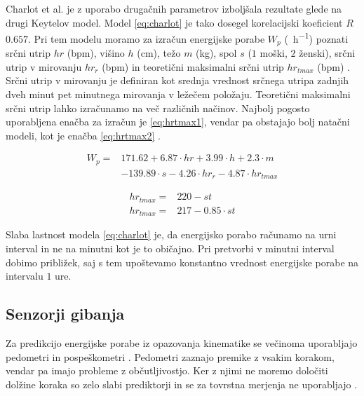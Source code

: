 Charlot et al. \cite{charlot2014improvement} je z uporabo drugačnih parametrov izboljšala rezultate glede na drugi Keytelov model. Model \eqref{eq:charlot} je tako dosegel korelacijski koeficient $R$ $0.657$. Pri tem modelu moramo za izračun energijske porabe $W_p$ (\si{\kcal.\hour^{-1}})  poznati srčni utrip $hr$ (\si{bpm}), višino $h$ (\si{\cm}), težo $m$ (\si{\kg}), spol $s$ ($1$ moški, $2$ ženski), srčni utrip v mirovanju $hr_r$ (\si{bpm}) in teoretični maksimalni srčni utrip $hr_{tmax}$ (\si{bpm}) \cite{charlot2014improvement}. Srčni utrip v mirovanju je definiran kot srednja vrednost srčnega utripa zadnjih dveh minut pet minutnega mirovanja v ležečem položaju. Teoretični maksimalni srčni utrip lahko izračunamo na več različnih načinov. Najbolj pogosto uporabljena enačba za izračun je \eqref{eq:hrtmax1}, vendar pa obstajajo bolj natačni modeli, kot je enačba \eqref{eq:hrtmax2} \cite{miller1993predicting}. 

\begin{align}\label{eq:charlot}
W_p = & 171.62 + 6.87 \cdot hr + 3.99 \cdot h + 2.3 \cdot m \nonumber \\
& - 139.89 \cdot s - 4.26 \cdot hr_r - 4.87 \cdot hr_{tmax}
\end{align}

\begin{align}
	hr_{tmax} = & 220 - st \label{eq:hrtmax1}\\ 
    hr_{tmax} = & 217 - 0.85 \cdot st \label{eq:hrtmax2}
\end{align}

Slaba lastnost modela \eqref{eq:charlot} je, da energijsko porabo računamo na urni interval in ne na minutni kot je to običajno. Pri pretvorbi v minutni interval dobimo približek, saj s tem upoštevamo konstantno vrednost energijske porabe na intervalu $1$ ure. 





\subsection{Senzorji gibanja}\label{sec:senzorji-gibanja}

Za predikcijo energijske porabe iz opazovanja kinematike se večinoma uporabljajo pedometri in pospeškometri \cite{levine2005measurement}. Pedometri zaznajo premike z vsakim korakom, vendar pa imajo probleme z občutljivostjo. Ker  z njimi ne moremo določiti dolžine koraka so zelo slabi prediktorji in se za tovrstna merjenja ne uporabljajo \cite{levine2005measurement}.

